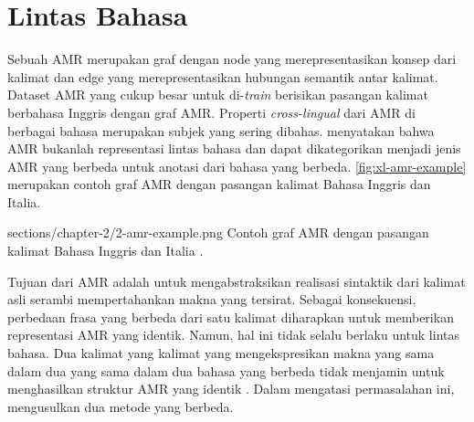\section{\amrparsing{} Lintas Bahasa}

Sebuah \gls{AMR} merupakan graf dengan node yang merepresentasikan konsep dari kalimat dan edge yang merepresentasikan hubungan semantik antar kalimat.
Dataset \gls{AMR} yang cukup besar untuk di-\textit{train} berisikan pasangan kalimat berbahasa Inggris dengan graf \gls{AMR}.
Properti \textit{cross-lingual} dari \gls{AMR} di berbagai bahasa merupakan subjek yang sering dibahas.
\textcite{banarescu2013} menyatakan bahwa \gls{AMR} bukanlah representasi lintas bahasa dan dapat dikategorikan menjadi jenis \gls{AMR} yang berbeda untuk anotasi dari bahasa yang berbeda.
\cref{fig:xl-amr-example} merupakan contoh graf \gls{AMR} dengan pasangan kalimat Bahasa Inggris dan Italia.

  {sections/chapter-2/2-amr-example.png}
  {Contoh graf \gls{AMR} dengan pasangan kalimat Bahasa Inggris dan Italia .}

Tujuan dari \gls{AMR} adalah untuk mengabstraksikan realisasi sintaktik dari kalimat asli serambi mempertahankan makna yang tersirat.
Sebagai konsekuensi, perbedaan frasa yang berbeda dari satu kalimat diharapkan untuk memberikan representasi \gls{AMR} yang identik.
Namun, hal ini tidak selalu berlaku untuk lintas bahasa.
Dua kalimat yang kalimat yang mengekspresikan makna yang sama dalam dua yang sama dalam dua bahasa yang berbeda tidak menjamin untuk menghasilkan struktur \gls{AMR} yang identik .
Dalam mengatasi permasalahan ini, \textcite{damonte2018} mengusulkan dua metode yang berbeda.


